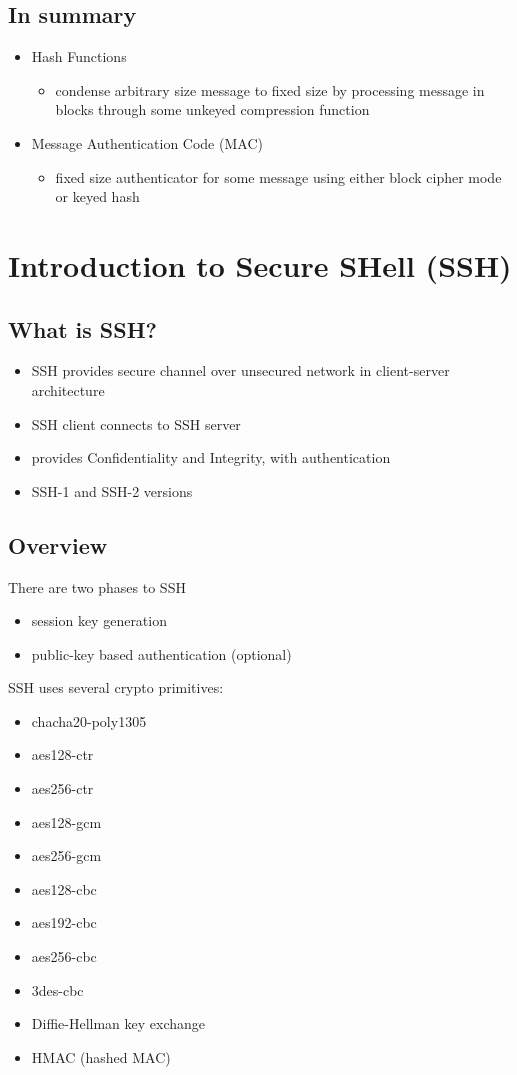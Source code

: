 \documentclass{article}
\begin{document}
\subsection{In summary}
\begin{itemize}
    \item Hash Functions
    \begin{itemize}
        \item condense arbitrary size message to fixed size by processing message in blocks through some unkeyed compression function
    \end{itemize}
    \item Message Authentication Code (MAC)
    \begin{itemize}
        \item fixed size authenticator for some message using either block cipher mode or keyed hash
    \end{itemize}
\end{itemize}
\section{Introduction to Secure SHell (SSH)}
\subsection{What is SSH?}
\begin{itemize}
    \item SSH provides secure channel over unsecured network in client-server architecture
    \item SSH client connects to SSH server
    \item provides Confidentiality and Integrity, with authentication
    \item SSH-1 and SSH-2 versions
\end{itemize}
\subsection{Overview}
There are two phases to SSH
\begin{itemize}
    \item session key generation
    \item public-key based authentication (optional)
\end{itemize}
SSH uses several crypto primitives:
\begin{itemize}
    \item chacha20-poly1305
    \item aes128-ctr
    \item aes256-ctr
    \item aes128-gcm
    \item aes256-gcm
    \item aes128-cbc
    \item aes192-cbc
    \item aes256-cbc
    \item 3des-cbc
    \item Diffie-Hellman key exchange
    \item HMAC (hashed MAC)
\end{itemize}
\end{document}
